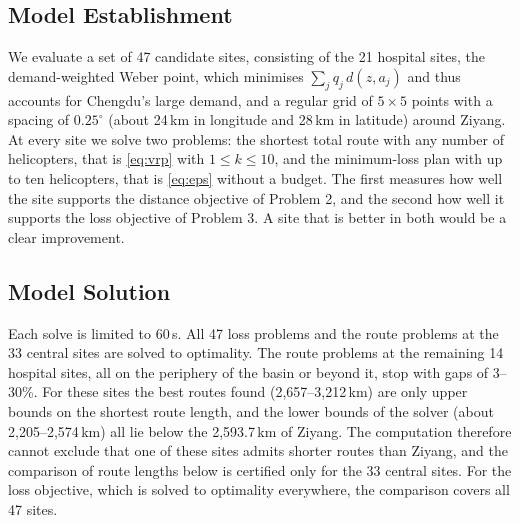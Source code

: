 \documentclass[11pt,a4paper]{article}
\theoremstyle{definition}
\begin{document}
\subsection{Model Establishment}
We evaluate a set of 47 candidate sites, consisting of the 21 hospital sites, the demand-weighted Weber point, which minimises $\sum_j q_j\,d(z,a_j)$ and thus accounts for Chengdu's large demand, and a regular grid of $5\times5$ points with a spacing of $0.25^\circ$ (about 24\,km in longitude and 28\,km in latitude) around Ziyang.
At every site we solve two problems: the shortest total route with any number of helicopters, that is \eqref{eq:vrp} with $1\le k\le10$, and the minimum-loss plan with up to ten helicopters, that is \eqref{eq:eps} without a budget.
The first measures how well the site supports the distance objective of Problem 2, and the second how well it supports the loss objective of Problem 3.
A site that is better in both would be a clear improvement.

\subsection{Model Solution}
Each solve is limited to 60\,s.
All 47 loss problems and the route problems at the 33 central sites are solved to optimality.
The route problems at the remaining 14 hospital sites, all on the periphery of the basin or beyond it, stop with gaps of 3--30\%.
For these sites the best routes found (2{,}657--3{,}212\,km) are only upper bounds on the shortest route length, and the lower bounds of the solver (about 2{,}205--2{,}574\,km) all lie below the 2{,}593.7\,km of Ziyang.
The computation therefore cannot exclude that one of these sites admits shorter routes than Ziyang, and the comparison of route lengths below is certified only for the 33 central sites.
For the loss objective, which is solved to optimality everywhere, the comparison covers all 47 sites.
\end{document}
